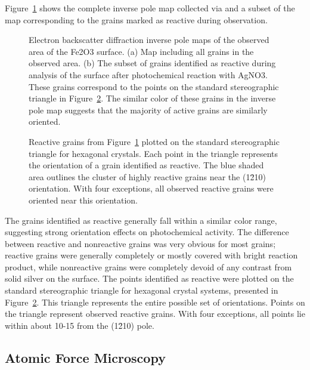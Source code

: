 \documentclass[12pt,%
              twoside,
               letterpaper]{uiothesis}
\begin{document}
Figure~\ref{fig:ebsdmapsem} shows the complete inverse pole map collected via  and a
subset of the map corresponding to the grains marked as reactive during 
observation.
\begin{figure}
	\caption[Inverse pole maps of Fe2O3 surface]{%
		Electron backscatter diffraction inverse pole maps of the 
		observed area of the Fe2O3 surface. (a) Map including 
		all grains in the observed area. (b) The subset of grains 
		identified as reactive during  analysis of the surface 
		after photochemical reaction with AgNO3. These grains 
		correspond to the points on the standard stereographic triangle 
		in Figure~\ref{fig:semtriangle}. The similar color of these 
		grains in the inverse pole map suggests that the majority 
		of active grains are similarly oriented. }
\label{fig:ebsdmapsem}
\end{figure}
\begin{figure}
		\caption[Reactive grains from Figure~\ref{fig:ebsdmapsem}]{%
			Reactive grains from Figure~\ref{fig:ebsdmapsem} plotted on 
			the standard stereographic triangle for hexagonal crystals. Each 
			point in the triangle represents the orientation of a grain 
			identified as reactive. The blue shaded area outlines the cluster 
			of highly reactive grains near the (1\={2}10) orientation. With 
			four exceptions, all observed reactive grains were oriented near 
			this orientation.}
	\label{fig:semtriangle}
\end{figure}
The grains identified as reactive generally fall within a similar color range, suggesting
strong orientation effects on photochemical activity. The difference between reactive and
nonreactive grains was very obvious for most grains; reactive grains were generally
completely or mostly covered with bright reaction product, while nonreactive grains were
completely devoid of any contrast from solid silver on the surface. The points identified
as reactive were plotted on the standard stereographic triangle for hexagonal crystal
systems, presented in Figure~\ref{fig:semtriangle}. This triangle represents the entire
possible set of orientations. Points on the triangle represent observed reactive grains.
With four exceptions, all points lie within about 10-15\degree{} from the (1\={2}10) pole.


\subsection{Atomic Force Microscopy}
\label{subsec:ch9afm}
\end{document}
